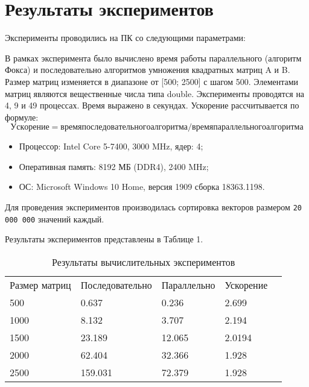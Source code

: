 \documentclass{report}
\begin{document}
\section*{Результаты экспериментов}
Эксперименты проводились на ПК со следующими параметрами:

\par В рамках эксперимента было вычислено время работы параллельного (алгоритм Фокса) и последовательно алгоритмов умножения квадратных матриц A и B. Размер матриц изменяется в диапазоне от [500; 2500] с шагом 500. Элементами матриц являются вещественные числа типа double. Эксперименты проводятся на 4, 9 и 49 процессах. Время выражено в секундах. Ускорение рассчитывается по формуле: \begin{equation} Ускорение = время последовательного алгоритма / время параллельного алгоритма \end{equation} 

\begin{itemize}
	\item Процессор: Intel Core 5-7400, 3000 MHz, ядер: 4;
	\item Оперативная память: 8192 МБ (DDR4), 2400 MHz;
	\item ОС: Microsoft Windows 10 Home, версия 1909 сборка 18363.1198.
\end{itemize}

\par Для проведения экспериментов производилась сортировка векторов размером \verb|20 000 000| значений каждый. 
\par Результаты экспериментов представлены в Таблице 1.

\begin{table}[!h]
	\caption{Результаты вычислительных экспериментов}
	\centering
	\begin{tabular}{lllll}
		Размер матриц & Последовательно & Параллельно & Ускорение \\
		500             & 0.637         & 0.236     & 2.699       \\
		1000            & 8.132         & 3.707     & 2.194       \\
		1500            & 23.189        & 12.065    & 2.0194      \\
		2000            & 62.404        & 32.366    & 1.928       \\
		2500            & 159.031       & 72.379    & 1.928       \\
	\end{tabular}
\end{table}
\end{document}
